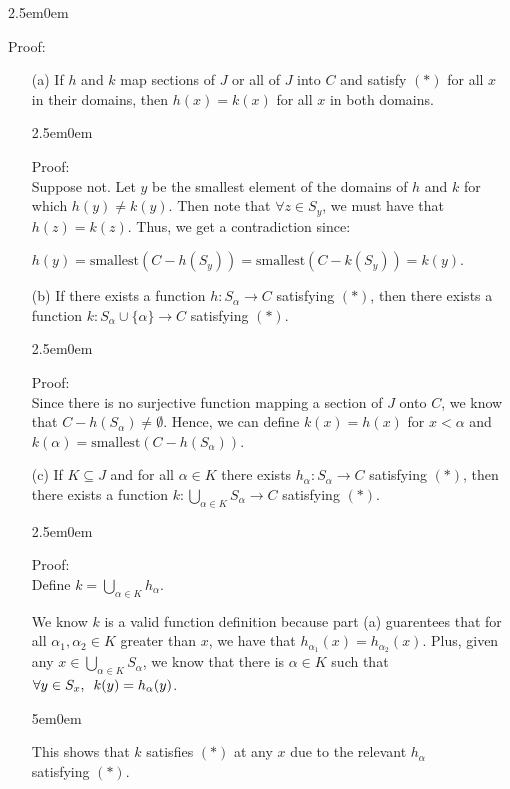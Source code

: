 \documentclass{book}
\newcommand{\exTwo}{%
\color{Purple}%
   \fontsize{13}{15}\selectfont%
}
\newcommand{\exPP}{%
   \color{RedViolet}%
   \fontsize{12}{14}\selectfont%
}
\newenvironment{myIndent}{%
   \begin{adjustwidth}{2.5em}{0em}%
}{%
   \end{adjustwidth}%
}
\newenvironment{myDindent}{%
   \begin{adjustwidth}{5em}{0em}%
}{%
   \end{adjustwidth}%
}
\newcommand{\myHS}{ \hspace{0.5em}}
\newcommand{\retTwo}{\hfill\bigbreak}
\begin{document}
   \begin{myIndent}\exTwo
      Proof:
      \begin{itemize}
         \item[(a)] If $h$ and $k$ map sections of $J$ or all of $J$ into $C$ and satisfy $(*)$ for all $x$ in their domains, then $h(x) = k(x)$ for all $x$ in both domains.
         
         \begin{myIndent}\exPP
            Proof:\\
            Suppose not. Let $y$ be the smallest element of the domains of $h$ and $k$ for which $h(y) \neq k(y)$. Then note that $\forall z \in S_y$, we must have that $h(z) = k(z)$. Thus, we get a contradiction since:

            {\centering $h(y) = \text{smallest}(C - h(S_y)) = \text{smallest}(C - k(S_y)) = k(y)$.\newpage\par}
         \end{myIndent}

         \item[(b)] If there exists a function $h: S_\alpha \longrightarrow C$ satisfying $(*)$, then there exists a function $k: S_\alpha \cup \{\alpha\} \longrightarrow C$ satisfying $(*)$.
         \begin{myIndent}\exPP
            Proof:\\
            Since there is no surjective function mapping a section of $J$ onto $C$, we know that $C - h(S_\alpha) \neq \emptyset$. Hence, we can define $k(x) = h(x)$ for $x < \alpha$ and $k(\alpha) = \text{smallest}(C - h(S_\alpha))$.\retTwo
         \end{myIndent}

         \item[(c)] If $K \subseteq J$ and for all $\alpha \in K$ there exists $h_\alpha: S_\alpha \longrightarrow C$ satisfying $(*)$, then there exists a function $k: \bigcup\limits_{\alpha \in K}S_\alpha \longrightarrow C$ satisfying $(*)$.\\ [-16pt]
         \begin{myIndent}\exPP
            Proof:\\
            Define $k = \bigcup\limits_{\alpha \in K} h_\alpha$.\retTwo

            We know $k$ is a valid function definition because part (a) guarentees that for all $\alpha_1, \alpha_2 \in K$ greater than $x$, we have that $h_{\alpha_1}(x) = h_{\alpha_2}(x)$. Plus,  given any $x \in \bigcup\limits_{\alpha \in K}S_\alpha$, we know that there is $\alpha \in K$ such that $\forall y \in S_x,\myHS k(y) = h_\alpha(y)$.\\ [-16pt]
            \begin{myDindent}
               \phantom{aa.a}This shows that $k$ satisfies $(*)$ at any $x$ due to the relevant $h_\alpha$\\\phantom{a.aa}satisfying $(*)$.\retTwo
            \end{myDindent}
         \end{myIndent}


\end{itemize}
\end{myIndent}
\end{document}

